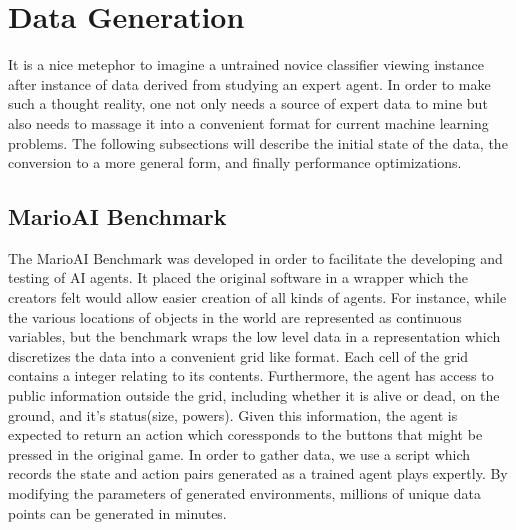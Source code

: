 \documentclass[]{article}   %
\begin{document}
\section{Data Generation}     %
\label{sec:datagen}
It is a nice metephor to imagine a untrained novice classifier viewing instance after instance of data derived from studying an expert agent.  In order to make such a thought reality, one not only needs a source of expert data to mine but also needs to massage it into a convenient format for current machine learning problems.  The following subsections will describe the initial state of the data, the conversion to a more general form, and finally performance optimizations.
\subsection{MarioAI Benchmark}
The MarioAI Benchmark \cite{mariobenchmark} was developed in order to facilitate the developing and testing of AI agents.  It placed the original software in a wrapper which the creators felt would allow easier creation of all kinds of agents.  For instance, while the various locations of objects in the world are represented as continuous variables, but the benchmark wraps the low level data in a representation which discretizes the data into a convenient grid like format.  Each cell of the grid contains a integer relating to its contents.  Furthermore, the agent has access to public information outside the grid, including whether it is alive or dead, on the ground, and it's status(size, powers).  Given this information, the agent is expected to return an action which coressponds to the buttons that might be pressed in the original game.  In order to gather data, we use a script which records the state and action pairs generated as a trained agent plays expertly.  By modifying the parameters of generated environments, millions of unique data points can be generated in minutes.
\end{document}
